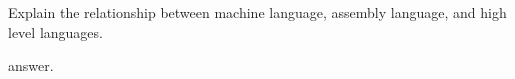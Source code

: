 Explain the relationship between machine language, assembly language, and high level languages.
\begin{answer}
answer.
\end{answer}